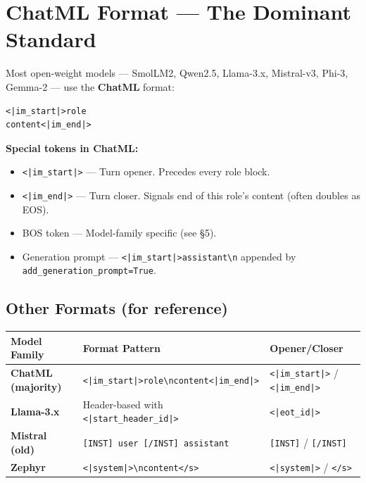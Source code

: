 \documentclass[11pt,a4paper]{article}
\newcommand{\tok}[1]{\texttt{\color{accentPurple}#1}}
\begin{document}
\section{ChatML Format --- The Dominant Standard}

Most open-weight models --- SmolLM2, Qwen2.5, Llama-3.x, Mistral-v3, Phi-3, Gemma-2 --- use the \textbf{ChatML} format:

\begin{lstlisting}[style=chatml]
<|im_start|>role
content<|im_end|>
\end{lstlisting}

\textbf{Special tokens in ChatML:}

\begin{itemize}[noitemsep, topsep=2pt]
  \item \tok{<|im\_start|>} --- Turn opener. Precedes every role block.
  \item \tok{<|im\_end|>} --- Turn closer. Signals end of this role's content (often doubles as EOS).
  \item BOS token --- Model-family specific (see \S5).
  \item Generation prompt --- \tok{<|im\_start|>assistant\textbackslash n} appended by \texttt{add\_generation\_prompt=True}.
\end{itemize}

\subsection{Other Formats (for reference)}

\renewcommand{\arraystretch}{1.3}
\begin{tabularx}{\linewidth}{>{\bfseries}p{3.2cm} X p{3.8cm}}
\toprule
Model Family & Format Pattern & Opener/Closer \\
\midrule
ChatML (majority) & \texttt{<|im\_start|>role\textbackslash ncontent<|im\_end|>} & \tok{<|im\_start|>} / \tok{<|im\_end|>} \\
Llama-3.x & Header-based with \texttt{<|start\_header\_id|>} & \texttt{<|eot\_id|>} \\
Mistral (old) & \texttt{[INST] user [/INST] assistant} & \texttt{[INST]} / \texttt{[/INST]} \\
Zephyr & \texttt{<|system|>\textbackslash ncontent</s>} & \texttt{<|system|>} / \texttt{</s>} \\
\bottomrule
\end{tabularx}
\end{document}
